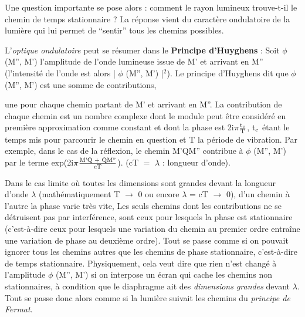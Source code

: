 Une question importante se pose alors : comment le rayon
lumineux trouve-t-il le chemin de temps stationnaire ? La réponse vient
du caractère ondulatoire de la lumière qui lui permet de “sentir” tous
les chemins possibles.

L'{\it optique ondulatoire} peut se résumer dans le {\bf Principe
d'Huyghens} : Soit $\phi$ (M'', M') l'amplitude de l'onde lumineuse issue de
M' et arrivant en M'' (l'intensité de l'onde est alors | $\phi$ (M'', M') |$^2$).
Le principe d'Huyghens dit que $\phi$ (M'', M') est une somme de contributions,
\begin{center}  \end{center}
une pour chaque chemin partant de M' et arrivant en M''. La contribution
de chaque chemin est un nombre complexe dont le module peut être considéré
en première approximation comme constant et dont la phase est
2i$\pi \frac{\text{t}_{\text{c}}}{\text{T}}$, t$_{\text{c}}$ étant le temps mis pour parcourir le chemin en question
et T la période de vibration. Par exemple, dans le cas de la réflexion, le chemin M'QM'' contribue à
$\phi$ (M'', M') par le terme exp(2i$\pi \frac{\text{M'Q + QM''}}{\text{cT}}$). (cT $=$ $\lambda$ : longueur d'onde).

Dans le cas limite où toutes les dimensions sont grandes devant
la longueur d'onde $\lambda$ (mathématiquement T $\to$ 0 ou encore $\lambda$ = cT $\to$ 0), d'un
chemin à l'autre la phase varie très vite, Les seuls chemins dont les
contributions ne se détruisent pas par interférence, sont ceux pour lesquels la phase est stationnaire
(c'est-à-dire ceux pour lesquels une variation du chemin au premier ordre entraîne une variation de phase
au deuxième ordre). Tout se passe comme si on pouvait ignorer tous les chemins autres que les chemins de
phase stationnaire, c'est-à-dire de temps
stationnaire. Physiquement, cela veut dire que rien n'est changé à l'amplitude  $\phi$ (M'', M')
si on interpose
un écran qui cache les chemins non
stationnaires, à condition que le diaphragme ait des {\it dimensions grandes}
devant $\lambda$. Tout se passe donc alors comme si la lumière suivait les chemins du {\it principe de Fermat}.


